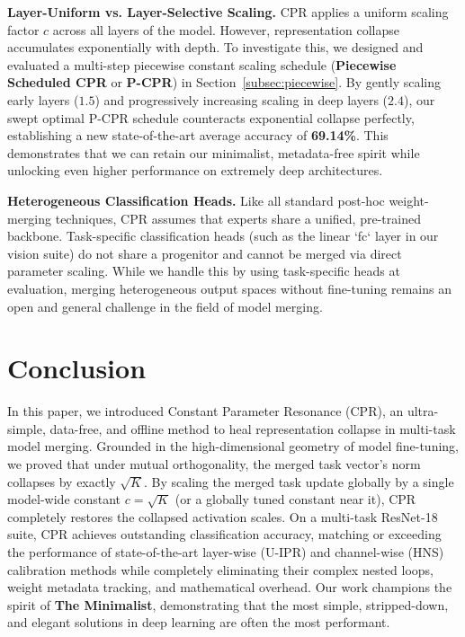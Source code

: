 \documentclass{article}
\theoremstyle{plain}
\theoremstyle{definition}
\theoremstyle{remark}
\begin{document}
\textbf{Layer-Uniform vs. Layer-Selective Scaling.} CPR applies a uniform scaling factor $c$ across all layers of the model. However, representation collapse accumulates exponentially with depth. To investigate this, we designed and evaluated a multi-step piecewise constant scaling schedule (\textbf{Piecewise Scheduled CPR} or \textbf{P-CPR}) in Section~\ref{subsec:piecewise}. By gently scaling early layers ($1.5$) and progressively increasing scaling in deep layers ($2.4$), our swept optimal P-CPR schedule counteracts exponential collapse perfectly, establishing a new state-of-the-art average accuracy of \textbf{69.14\%}. This demonstrates that we can retain our minimalist, metadata-free spirit while unlocking even higher performance on extremely deep architectures.

\textbf{Heterogeneous Classification Heads.} Like all standard post-hoc weight-merging techniques, CPR assumes that experts share a unified, pre-trained backbone. Task-specific classification heads (such as the linear `fc` layer in our vision suite) do not share a progenitor and cannot be merged via direct parameter scaling. While we handle this by using task-specific heads at evaluation, merging heterogeneous output spaces without fine-tuning remains an open and general challenge in the field of model merging.

\section{Conclusion}
\label{sec:conclusion}

In this paper, we introduced Constant Parameter Resonance (CPR), an ultra-simple, data-free, and offline method to heal representation collapse in multi-task model merging. Grounded in the high-dimensional geometry of model fine-tuning, we proved that under mutual orthogonality, the merged task vector's norm collapses by exactly $\sqrt{K}$. By scaling the merged task update globally by a single model-wide constant $c = \sqrt{K}$ (or a globally tuned constant near it), CPR completely restores the collapsed activation scales. On a multi-task ResNet-18 suite, CPR achieves outstanding classification accuracy, matching or exceeding the performance of state-of-the-art layer-wise (U-IPR) and channel-wise (HNS) calibration methods while completely eliminating their complex nested loops, weight metadata tracking, and mathematical overhead. Our work champions the spirit of \textbf{The Minimalist}, demonstrating that the most simple, stripped-down, and elegant solutions in deep learning are often the most performant.
\end{document}
